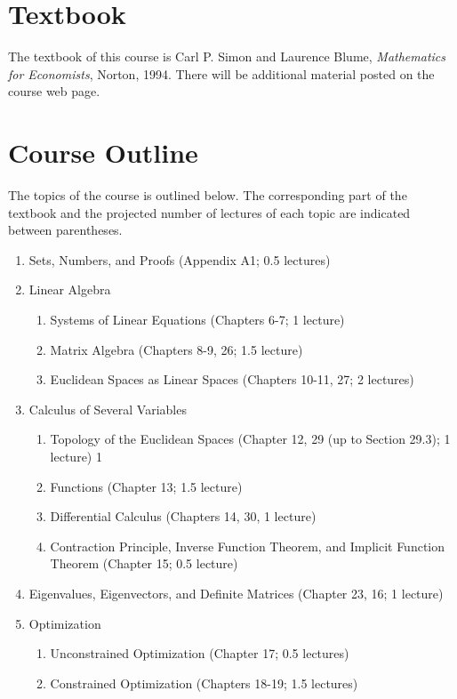 \documentclass[10pt]{article}
\begin{document}
\section{Textbook}
The textbook of this course is Carl P. Simon and Laurence Blume,
\textit{Mathematics for Economists}, Norton, 1994.  There will be
additional material posted on the course web page.

\section{Course Outline}

The topics of the course is outlined below. The corresponding part of
the textbook and the projected number of lectures of each topic are
indicated between parentheses. 

\begin{enumerate}
\item Sets, Numbers, and Proofs (Appendix A1; 0.5 lectures)
\item Linear Algebra
  \begin{enumerate}
  \item Systems of Linear Equations (Chapters 6-7; 1 lecture)
  \item Matrix Algebra (Chapters 8-9, 26; 1.5 lecture)
  \item Euclidean Spaces as Linear Spaces (Chapters 10-11, 27; 2 lectures)
  \end{enumerate}
\item Calculus of Several Variables
  \begin{enumerate}
  \item Topology of the Euclidean Spaces (Chapter 12, 29 (up to
    Section 29.3); 1 lecture) 1 \item Functions (Chapter 13; 1.5
    lecture)
  \item  Differential Calculus (Chapters 14, 30, 1 lecture)
  \item Contraction Principle, Inverse Function Theorem, and Implicit
    Function Theorem (Chapter 15; 0.5 lecture)
  \end{enumerate}
\item Eigenvalues, Eigenvectors, and Definite Matrices (Chapter 23,
  16; 1 lecture)
\item Optimization
  \begin{enumerate}
  \item Unconstrained Optimization (Chapter 17; 0.5 lectures)
  \item Constrained Optimization (Chapters 18-19; 1.5 lectures)

\end{enumerate}
\end{enumerate}
\end{document}
